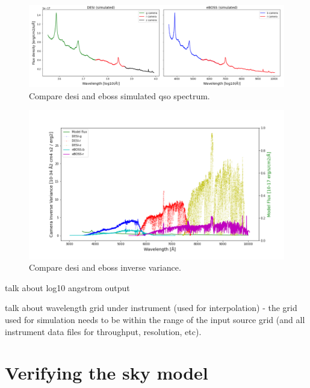 \begin{figure}[h]
\centering
\includegraphics[width=16cm]{images/specsim/sim_comparison.png}
\caption{Compare desi and eboss simulated qso spectrum.}
\label{fig:sim_comparison}
\end{figure}

\begin{figure}[h]
\centering
\includegraphics[width=16cm]{images/specsim/ivar_comparison.png}
\caption{Compare desi and eboss inverse variance.}
\label{fig:ivar_comparison}
\end{figure}

talk about log10 angstrom output

talk about wavelength grid under instrument (used for interpolation) - the grid used for simulation needs to be within the range of the input source grid (and all instrument data files for throughput, resolution, etc).  


\section{Verifying the  sky model}


